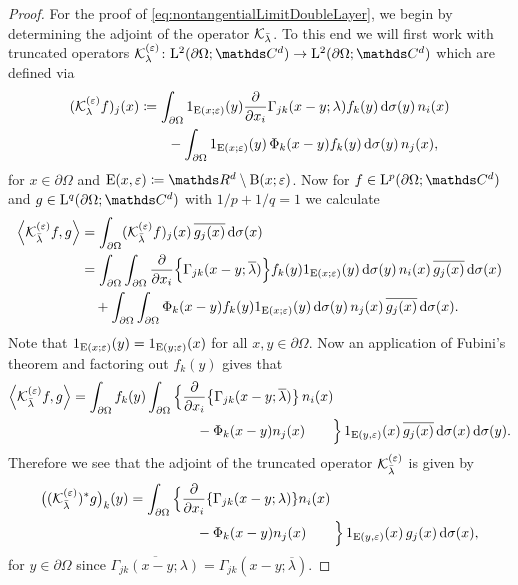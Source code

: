 \begin{proof}
  For the proof of \eqref{eq:nontangentialLimitDoubleLayer}, we begin by determining the adjoint of the operator $\mathcal{K}_{\bar\lambda}$.
  To this end we will first work with truncated operators $\K_{\lambda}^{(\varepsilon)} \colon \Ell^2(\partial\Omega; \C^d) \to \Ell^2(\partial\Omega; \C^d)$ which are defined via
  \begin{align*}
    (\mathcal{K}_\lambda^{(\varepsilon)} f)_j (x)
    &\coloneqq \int_{\partial\Omega} 1_{\mathrm{E}(x;\varepsilon)}(y) \frac{\partial}{\partial x_i} \Gamma_{jk}(x - y; \lambda)  f_k(y) \, {\operatorname{d}\!{\sigma}}(y) \, n_i(x) \\
    &\qquad - \int_{\partial\Omega} 1_{\mathrm{E}(x;\varepsilon)}(y)\, \Phi_k(x - y) f_k(y) \, {\operatorname{d}\!{\sigma}}(y) \, n_j(x),
  \end{align*}
  for $x \in \partial\Omega$ and $\EE(x,\varepsilon) \coloneqq \R^d \setminus \BB(x; \varepsilon)$.
  Now for $f \in \Ell^p(\partial\Omega; \C^d)$ and $g \in \Ell^q(\partial\Omega; \C^d)$ with $1/p + 1/q = 1$ we calculate
  \begin{align*}
    \Big\langle \mathcal{K}_{\bar\lambda}^{(\varepsilon)}f, g \Big\rangle
    &= \int_{\partial\Omega} (\mathcal{K}_{\bar\lambda}^{(\varepsilon)} f)_j(x) \, \overline{g_j(x)} \, {\operatorname{d}\!{\sigma}}(x) \\
    &= \int_{\partial\Omega} \int_{\partial\Omega} \frac{\partial}{\partial x_i} \Big\{ \Gamma_{jk} (x - y; \overline\lambda) \Big\} f_k(y) 1_{\mathrm{E}(x;\varepsilon)}(y) \, {\operatorname{d}\!{\sigma}}(y) \, n_i(x) \, \overline{g_j(x)} \, {\operatorname{d}\!{\sigma}}(x) \\
    &\quad+ \int_{\partial\Omega} \int_{\partial\Omega} \Phi_k(x -y)f_k(y) 1_{\mathrm{E}(x; \varepsilon)}(y) \, {\operatorname{d}\!{\sigma}}(y) \, n_j(x) \, \overline{g_j(x)} \, {\operatorname{d}\!{\sigma}}(x).
  \end{align*}
  Note that $1_{\mathrm{E}(x;\varepsilon)}(y) = 1_{\mathrm{E}(y;\varepsilon)}(x)$ for all $x, y \in \partial\Omega$.
  Now an application of Fubini's theorem and factoring out $f_k(y)$ gives that 
  \begin{align*}
    \Big\langle \mathcal{K}_{\bar\lambda}^{(\varepsilon)}f, g \Big\rangle 
    =
    \int_{\partial\Omega} f_k(y) \int_{\partial\Omega} \Big\{ & \frac{\partial}{\partial x_i} \big\{  \Gamma_{jk}(x - y; \overline\lambda)\big\}\, n_i(x) \\
    &\quad - \Phi_k(x - y)  n_j(x) \qquad \Big\}\, 1_{\mathrm{E}(y, \varepsilon)}(x)\, \overline{g_j(x)} \, {\operatorname{d}\!{\sigma}}(x) \, {\operatorname{d}\!{\sigma}}(y).
  \end{align*}
  Therefore we see that the adjoint of the truncated operator $\mathcal{K}_{\bar\lambda}^{(\varepsilon)}$ is given by
  \begin{align*}
    \big( ( \mathcal{K}_{\bar\lambda}^{(\varepsilon)})^* g\big)_k(y)
    = \int_{\partial\Omega} \Big\{ &\frac{\partial}{\partial x_i} \{ \Gamma_{jk}(x - y; \lambda)\} n_i(x) \\
    &\quad - \Phi_k(x - y) n_j(x) \qquad \Big\}\, 1_{\mathrm{E}(y,\varepsilon)}(x) \, g_j(x) \, {\operatorname{d}\!{\sigma}}(x), 
  \end{align*}
  for $y \in \partial\Omega$ since $\overline{\Gamma_{jk}(x - y; \lambda)} = \Gamma_{jk}(x - y; \overline\lambda)$.


\end{proof}
